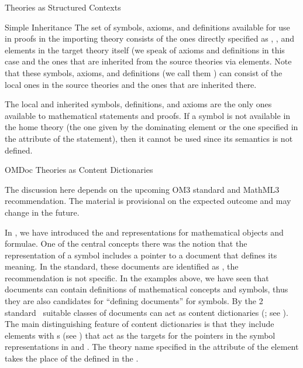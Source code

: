 \begin{omgroup}[short=Mathematical Statements,id=statements]
\begin{omgroup}[id=theories-contexts]{Theories as Structured Contexts}
\begin{module}[id=theories]
\begin{omgroup}[id=inheritance]{Simple Inheritance}
The set of symbols, axioms, and definitions available for use in proofs in the importing
theory consists of the ones directly specified as {}, {},
and {} elements in the target theory itself (we speak of
{} axioms and definitions in this case and the ones that are inherited from
the source theories via {} elements.  Note that these symbols, axioms,
and definitions (we call them {}) can consist of the local ones in the
source theories and the ones that are inherited there.

The local and inherited symbols, definitions, and axioms are the only ones
available to mathematical statements and proofs. If a symbol is not available in
the home theory (the one given by the dominating {} element or the
one specified in the {} attribute of the statement),
then it cannot be used since its semantics is not defined.
\end{omgroup}

\begin{omgroup}[id=identifying]{OMDoc Theories as Content Dictionaries}
\begin{oldpart}{The discussion here depends on the upcoming OM3 standard and MathML3
    recommendation. The material is provisional on the expected outcome and may change in
    the future.}


  In {}, we have introduced the {\openmath} and {\cmathml} representations
  for mathematical objects and formulae. One of the central concepts there was the notion
  that the representation of a symbol includes a pointer to a document that defines its
  meaning.  In the {\openmath} standard, these documents are identified as
  , the
  {\mathml} recommendation is not specific.  In the examples above, we have seen that
  {\omdoc} documents can contain definitions of mathematical concepts and symbols, thus
  they are also candidates for ``defining documents'' for symbols.  By the {\openmath}2
  standard~\cite{BusCapCar:2oms04} suitable classes of {\omdoc} documents can act as
  {\openmath} content dictionaries (; see {}).
  The main distinguishing feature of {\omdoc} content dictionaries is that they include
  {} elements with {s} (see
  {}) that act as the targets for the pointers in the symbol
  representations in {\openmath} and {\cmathml}. The theory name specified in the
  {} attribute of the {} element takes
  the place of the {} defined in the .
 

\end{oldpart}
\end{omgroup}
\end{module}
\end{omgroup}
\end{omgroup}
